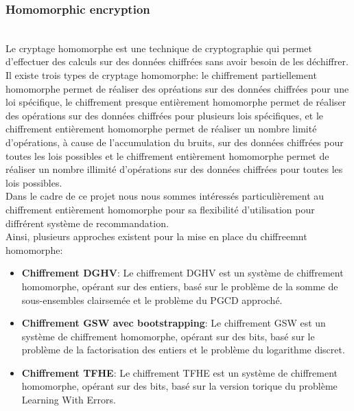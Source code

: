 \documentclass{article}
\begin{document}
\subsubsection{Homomorphic encryption}
$ $\\
Le cryptage homomorphe est une technique de cryptographie qui permet d'effectuer des calculs sur des données chiffrées sans avoir besoin de les déchiffrer. 
Il existe trois types de cryptage homomorphe: le chiffrement partiellement homomorphe permet de réaliser des opréations sur des données chiffrées pour une loi spécifique, 
le chiffrement presque entièrement homomorphe permet de réaliser des opérations sur des données chiffrées pour plusieurs lois spécifiques, et le chiffrement entièrement 
homomorphe permet de réaliser un nombre limité d'opérations, à cause de l'accumulation du bruits, sur des données chiffrées pour toutes les lois possibles et le chiffrement entièrement homomorphe permet de 
réaliser un nombre illimité d'opérations sur des données chiffrées pour toutes les lois possibles.\\
Dans le cadre de ce projet nous nous sommes intéressés particulièrement au chiffrement entièrement homomorphe pour sa flexibilité d'utilisation pour diffrérent système de recommandation.\\
Ainsi, plusieurs approches existent pour la mise en place du chiffreemnt homomorphe: \\
\begin{itemize}
    \item \textbf{Chiffrement DGHV}: Le chiffrement DGHV est un système de chiffrement homomorphe, opérant sur des entiers, basé sur le problème de la somme de sous-ensembles clairsemée et le problème du PGCD approché.
    \item \textbf{Chiffrement GSW avec bootstrapping}: Le chiffrement GSW est un système de chiffrement homomorphe, opérant sur des bits, basé sur le problème de la factorisation des entiers et le problème du logarithme discret.
    \item \textbf{Chiffrement TFHE}: Le chiffrement TFHE est un système de chiffrement homomorphe, opérant sur des bits, basé sur la version torique du problème Learning With Errors.
\end{itemize}
\end{document}
